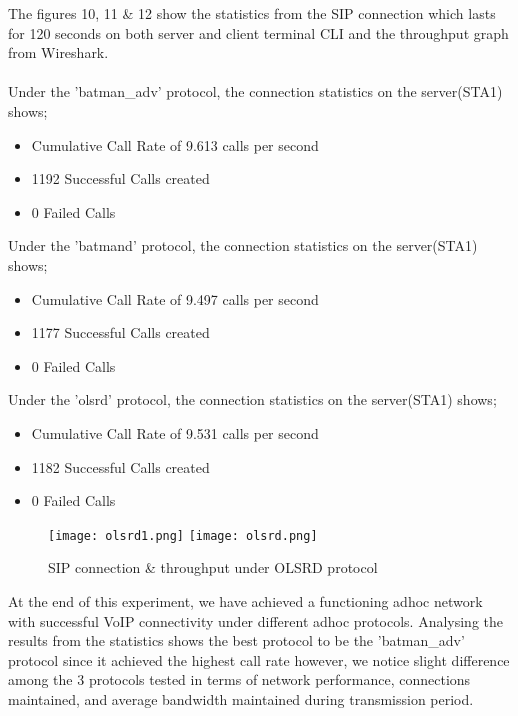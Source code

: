 \documentclass{article}
\begin{document}
\par The figures 10, 11 \& 12 show the statistics from the SIP connection which lasts for 120 seconds on both server and client terminal CLI and the throughput graph from Wireshark. \\\\ Under the 'batman\_adv' protocol, the connection statistics on the server(STA1) shows;
	\begin{itemize}
		\item Cumulative Call Rate of 9.613 calls per second
		\item 1192 Successful Calls created
		\item 0 Failed Calls
	\end{itemize}
Under the 'batmand' protocol, the connection statistics on the server(STA1) shows;
	\begin{itemize}
		\item Cumulative Call Rate of 9.497 calls per second
		\item 1177 Successful Calls created
		\item 0 Failed Calls
	\end{itemize}
Under the 'olsrd' protocol, the connection statistics on the server(STA1) shows;
	\begin{itemize}
		\item Cumulative Call Rate of 9.531 calls per second
		\item 1182 Successful Calls created
		\item 0 Failed Calls
	\end{itemize}
\newpage
    	\begin{figure}[]
        		\centering
        		\texttt{[image: olsrd1.png]}
        		\texttt{[image: olsrd.png]}
        		\caption{SIP connection \& throughput under OLSRD protocol}
        		\label{fig:t2-4}
    	\end{figure}
\par At the end of this experiment, we have achieved a functioning adhoc network with successful VoIP connectivity under different adhoc protocols. Analysing the results from the statistics shows the best protocol to be the 'batman\_adv' protocol since it achieved the highest call rate however, we notice slight difference among the 3 protocols tested in terms of network performance, connections maintained, and average bandwidth maintained during transmission period.

\newpage
\end{document}
